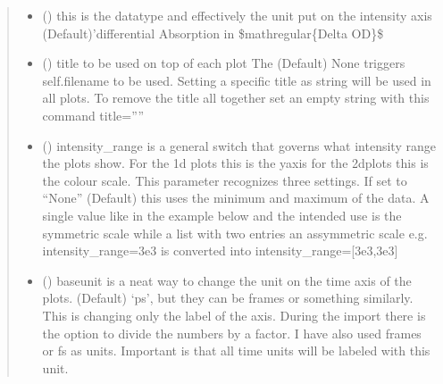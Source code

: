 \documentclass[letterpaper,10pt,english]{sphinxmanual}
\begin{document}
\begin{fulllineitems}
\begin{quote}
\begin{description}
\begin{itemize}
\item {} 
 () \textendash{} this is the datatype and effectively the unit put on the intensity axis
(Default)’differential Absorption in \$mathregular\{Delta OD\}\$

\item {} 
 () \textendash{} title to be used on top of each plot
The (Default) None triggers  self.filename to be used. Setting a specific title as string will
be used in all plots. To remove the title all together set an empty string with this command title=””

\item {} 
 (\sphinxstyleliteralemphasis{\sphinxupquote{, }}\sphinxstyleliteralemphasis{\sphinxupquote{ {[}}}\sphinxstyleliteralemphasis{\sphinxupquote{{]}}}) \textendash{} intensity\_range is a general switch that governs what intensity range the plots show.
For the 1d plots this is the y\sphinxhyphen{}axis for the 2d\sphinxhyphen{}plots this is the colour scale.
This parameter recognizes three settings. If set to “None” (Default) this uses the minimum and
maximum of the data. A single value like in the example below and the intended use is the symmetric
scale while a list with two entries an assymmetric scale e.g.
intensity\_range=3e\sphinxhyphen{}3 is converted into intensity\_range={[}\sphinxhyphen{}3e\sphinxhyphen{}3,3e\sphinxhyphen{}3{]}

\item {} 
 () \textendash{} baseunit is a neat way to change the unit on the time axis of the plots. (Default) ‘ps’, but they
can be frames or something similarly. This is changing only the label of the axis.
During the import there is the option to divide the numbers by a factor.
I have also used frames or fs as units. Important is that all time units will be labeled with
this unit.


\end{itemize}
\end{description}
\end{quote}
\end{fulllineitems}
\end{document}
